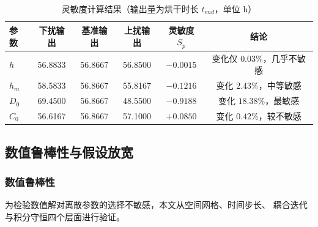 \documentclass[12pt,a4paper]{article}
\begin{document}
\begin{table}[H]
\centering
\caption{灵敏度计算结果（输出量为烘干时长 $t_{end}$，单位 h）}
\label{tab:sensitivity-result}
\begin{tabular}{lccccc}
\toprule
参数 & 下扰输出 & 基准输出 & 上扰输出 & 灵敏度 $S_p$ & 结论\\
\midrule
$h$ & 56.8833 & 56.8667 & 56.8500 & $-0.0015$ & 变化仅 $0.03\%$，几乎不敏感\\
$h_m$ & 58.5833 & 56.8667 & 55.8167 & $-0.1216$ & 变化 $2.43\%$，中等敏感\\
$D_0$ & 69.4500 & 56.8667 & 48.5500 & $-0.9188$ & 变化 $18.38\%$，最敏感\\
$C_0$ & 56.6167 & 56.8667 & 57.1000 & $+0.0850$ & 变化 $0.42\%$，较不敏感\\
\bottomrule
\end{tabular}
\end{table}

\subsection{数值鲁棒性与假设放宽}


\subsubsection{数值鲁棒性}
为检验数值解对离散参数的选择不敏感，本文从空间网格、时间步长、
耦合迭代与积分守恒四个层面进行验证。
\end{document}
